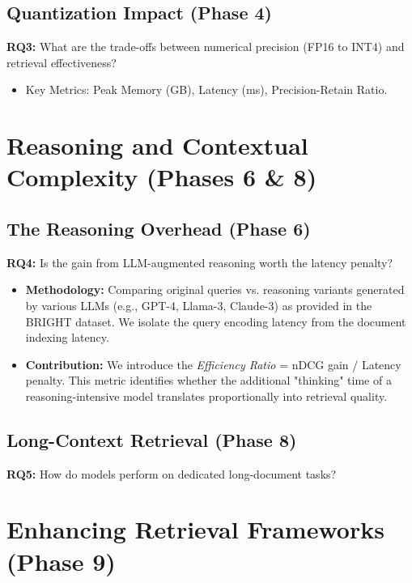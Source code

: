 \documentclass[sigconf]{acmart}
\begin{document}
\subsection{Quantization Impact (Phase 4)}
\textbf{RQ3:} What are the trade-offs between numerical precision (FP16 to INT4) and retrieval effectiveness?
\begin{itemize}
    \item Key Metrics: Peak Memory (GB), Latency (ms), Precision-Retain Ratio.
\end{itemize}

\section{Reasoning and Contextual Complexity (Phases 6 \& 8)}
\subsection{The Reasoning Overhead (Phase 6)}
\textbf{RQ4:} Is the gain from LLM-augmented reasoning worth the latency penalty?
\begin{itemize}
    \item \textbf{Methodology:} Comparing original queries vs. reasoning variants generated by various LLMs (e.g., GPT-4, Llama-3, Claude-3) as provided in the BRIGHT dataset. We isolate the query encoding latency from the document indexing latency.
    \item \textbf{Contribution:} We introduce the \textit{Efficiency Ratio} = nDCG gain / Latency penalty. This metric identifies whether the additional "thinking" time of a reasoning-intensive model translates proportionally into retrieval quality.
\end{itemize}
\subsection{Long-Context Retrieval (Phase 8)}
\textbf{RQ5:} How do models perform on dedicated long-document tasks?

\section{Enhancing Retrieval Frameworks (Phase 9)}
\end{document}
